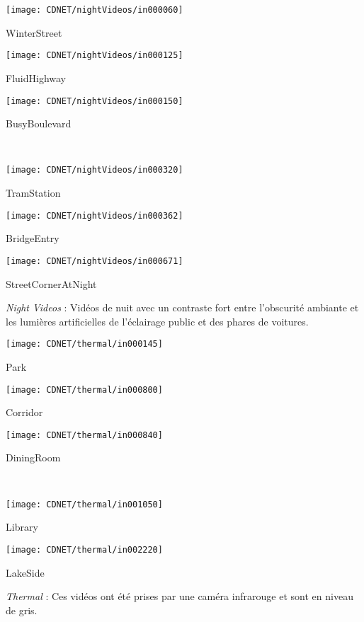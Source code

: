 	\begin{figureth}
		\begin{subfigureth}{0.24\textwidth}
			\texttt{[image: CDNET/nightVideos/in000060]}\caption{WinterStreet}	
		\end{subfigureth}
		\begin{subfigureth}{0.24\textwidth}
			\texttt{[image: CDNET/nightVideos/in000125]}\caption{FluidHighway}	
		\end{subfigureth}
		\begin{subfigureth}{0.24\textwidth}
			\texttt{[image: CDNET/nightVideos/in000150]}\caption{BusyBoulevard}	
		\end{subfigureth}\\
		\begin{subfigureth}{0.24\textwidth}
			\texttt{[image: CDNET/nightVideos/in000320]}\caption{TramStation}	
		\end{subfigureth}
		\begin{subfigureth}{0.24\textwidth}
			\texttt{[image: CDNET/nightVideos/in000362]}\caption{BridgeEntry}	
		\end{subfigureth}
		\begin{subfigureth}{0.24\textwidth}
			\texttt{[image: CDNET/nightVideos/in000671]}\caption{StreetCornerAtNight}	
		\end{subfigureth}
		\caption[Catégorie Night Videos]{\textit{Night Videos} : Vidéos de nuit avec un contraste fort entre l'obscurité ambiante et les lumières artificielles de l'éclairage public et des phares de voitures.}\label{fig:cdnet:night}
	\end{figureth}

	\begin{figureth}
		\begin{subfigureth}{0.24\textwidth}
			\texttt{[image: CDNET/thermal/in000145]}\caption{Park}
		\end{subfigureth}
		\begin{subfigureth}{0.24\textwidth}
			\texttt{[image: CDNET/thermal/in000800]}\caption{Corridor}	
		\end{subfigureth}
		\begin{subfigureth}{0.24\textwidth}
			\texttt{[image: CDNET/thermal/in000840]}\caption{DiningRoom}	
		\end{subfigureth}\\
		\begin{subfigureth}{0.24\textwidth}
			\texttt{[image: CDNET/thermal/in001050]}\caption{Library}	
		\end{subfigureth}
		\begin{subfigureth}{0.24\textwidth}
			\texttt{[image: CDNET/thermal/in002220]}\caption{LakeSide}	
		\end{subfigureth}
		\caption[Catégorie Thermal]{\textit{Thermal} : Ces vidéos ont été prises par une caméra infrarouge et sont en niveau de gris.}\label{fig:cdnet:shadow}
	\end{figureth}

